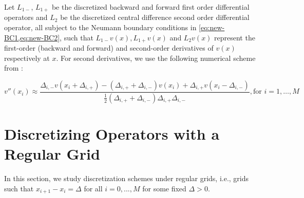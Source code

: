 \documentclass[11pt]{article}
\theoremstyle{definition}
\begin{document}
Let $L_{1-}$, $L_{1+}$ be the discretized backward and forward first order differential operators and $L_2$ be the discretized central difference  second order differential operator, all subject to the Neumann boundary conditions in \cref{eq:new-BC1,eq:new-BC2}, such that $L_{1-} v(x), L_{1+} v(x)$ and $L_2 v(x)$ represent the first-order (backward and forward) and second-order derivatives of $v(x)$ respectively at $x$. For second derivatives, we use the following numerical scheme from \cite{achdou17}:

\begin{equation}
v''(x_i) \approx \dfrac{ \Delta_{i,-} v( x_i + \Delta_{i,+}) - (\Delta_{i,+} + \Delta_{i,-}) v( x_i ) + \Delta_{i,+} v( x_i - \Delta_{i,-})}{\frac{1}{2}(\Delta_{i,+} + \Delta_{i,-}) \Delta_{i,+} \Delta_{i,-} }, \text{for } i = 1, \ldots, M
\end{equation}

\section{Discretizing Operators with a Regular Grid}
In this section, we study discretization schemes under regular grids, i.e., grids such that $x_{i+1} - x_i = \Delta$ for all $i = 0,...,M$ for some fixed $\Delta > 0$. 
\end{document}
